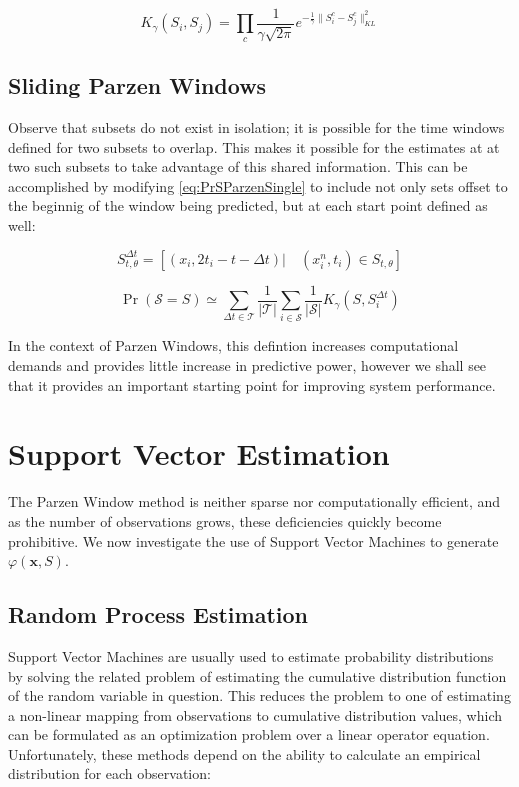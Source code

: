 \documentclass[10pt]{article}
\begin{document}
\begin{equation} \label{eq:KRBFParzenMultiple}
K_\gamma( S_i, S_j ) =  \prod_c \frac{1}{\gamma \sqrt{2\pi} } e^{-\frac{1}{\gamma} \|S_i^c - S_j^c \|_{KL}^2 }
\end{equation}


\subsection{Sliding Parzen Windows}

Observe that subsets do not exist in isolation; it is possible for the time windows defined for two subsets to overlap.  This makes it possible for the estimates at at two such subsets to take advantage of this shared information.  This can be accomplished by modifying \ref{eq:PrSParzenSingle} to include not only sets offset to the beginnig of the window being predicted, but at each start point defined as well:

\[
S_{t,\theta}^{\Delta t} =  \left[ \left( x_i, 2t_i - t - \Delta t \right) | \quad (x_i^n,t_i) \in S_{t,\theta} \right] 
\]

\begin{equation} \label{eq:PrSParzenSlidingSingle}
\Pr( \mathcal{S} = S ) \simeq \sum_{\Delta t \in \mathcal{T}} \frac{1}{|\mathcal{T}|} \sum_{i \in \mathcal{S}}  \frac{1}{|\mathcal{S}| } K_\gamma( S, S_i^{\Delta t} ) 
\end{equation}

In the context of Parzen Windows, this defintion increases computational demands and provides little increase in predictive power, however we shall see that it provides an important starting point for improving system performance.


\section{ Support Vector Estimation}

The Parzen Window method is neither sparse nor computationally efficient, and as the number of observations grows, these deficiencies quickly become prohibitive.  We now investigate the use of Support Vector Machines to generate \( \varphi(\mathbf{x}, S) \).

\subsection{ Random Process Estimation }
Support Vector Machines are usually used to estimate probability distributions by solving the related problem of estimating the cumulative distribution function of the random variable in question.  This reduces the problem to one of estimating a non-linear mapping from observations to cumulative distribution values, which can be formulated as an optimization problem over a linear operator equation.  Unfortunately, these methods depend on the ability to calculate an empirical distribution for each observation:
\end{document}
